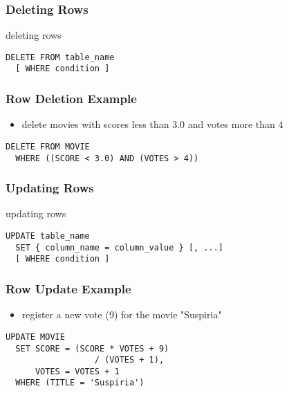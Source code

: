 \documentclass[dvipsnames]{beamer}
\theoremstyle{plain}
\begin{document}
\begin{frame}[fragile]
  \frametitle{Deleting Rows}

  \begin{block}{deleting rows}
    \begin{lstlisting}
DELETE FROM table_name
  [ WHERE condition ]
    \end{lstlisting}
  \end{block}
\end{frame}

\begin{frame}[fragile]
  \frametitle{Row Deletion Example}

  \begin{example}
    \begin{itemize}
      \item delete movies with scores less than 3.0 and votes more than 4
    \end{itemize}

    \begin{lstlisting}
DELETE FROM MOVIE
  WHERE ((SCORE < 3.0) AND (VOTES > 4))
    \end{lstlisting}
  \end{example}
\end{frame}

\begin{frame}[fragile]
  \frametitle{Updating Rows}

  \begin{block}{updating rows}
    \begin{lstlisting}
UPDATE table_name
  SET { column_name = column_value } [, ...]
  [ WHERE condition ]
    \end{lstlisting}
  \end{block}
\end{frame}

\begin{frame}[fragile]
  \frametitle{Row Update Example}

  \begin{example}
    \begin{itemize}
      \item register a new vote (9) for the movie "Suspiria"
    \end{itemize}

    \begin{lstlisting}
UPDATE MOVIE
  SET SCORE = (SCORE * VOTES + 9)
                  / (VOTES + 1),
      VOTES = VOTES + 1
  WHERE (TITLE = 'Suspiria')
    \end{lstlisting}
  \end{example}
\end{frame}
\end{document}
